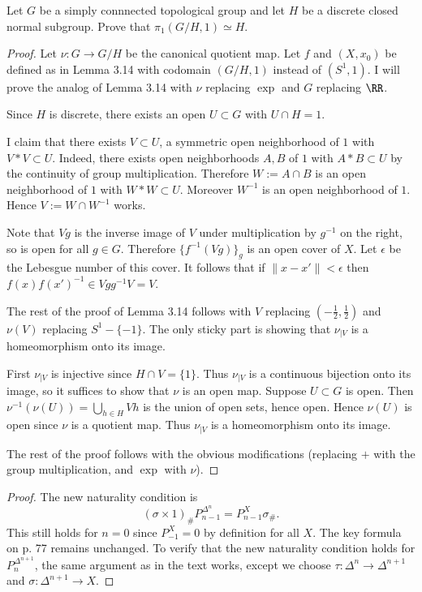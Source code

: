 \documentclass{article}
\begin{document}
 Let $G$ be a simply connnected topological group and let $H$ be a discrete closed
normal subgroup. Prove that $\pi_1(G/H, 1) \simeq H$.
\begin{proof}
Let $\nu: G \to G/H$ be the canonical quotient map. Let $f$ and $(X,x_0)$ be defined as in Lemma 3.14 with
codomain $(G/H,1)$ instead of $(S^1, 1)$. I will prove the analog of Lemma 3.14 with
$\nu$ replacing $\exp$ and $G$ replacing $\RR$.

Since $H$ is discrete, there exists an open $U \subset G$ with $U \cap H = 1$. 

I claim that there exists $V \subset U$, a symmetric open neighborhood of $1$ with $V*V \subset U$.
Indeed, there exists open neighborhoods $A,B$ of $1$ with $A*B \subset U$ by the continuity of 
group multiplication.  Therefore $W := A \cap B$ is an open neighborhood of $1$ with $W*W \subset U$.
Moreover $W^{-1}$ is an open neighborhood of $1$.  Hence $V:= W \cap W^{-1}$ works.

Note that $Vg$ is the inverse image of $V$ under multiplication by $g^{-1}$ on the right, so is open for all $g \in G$. 
Therefore $\{f^{-1}(Vg)\}_g$ is an open cover of $X$. Let $\epsilon$ be the Lebesgue number of this cover. It follows that if $\|x - x'\| < \epsilon$
then $f(x) f(x')^{-1} \in Vg g^{-1}V = V$.

The rest of the proof of Lemma 3.14 follows with $V$ replacing $(-\frac 1 2, \frac 1 2)$ and $\nu(V)$ replacing $S^1 - \{-1\}$. The only
sticky part is showing that $\nu_{|V}$ is a homeomorphism onto its image.

First $\nu_{|V}$ is injective since $H \cap V = \{1\}$. Thus $\nu_{|V}$ is a continuous bijection onto its image, so it suffices to show that
$\nu$ is an open map. Suppose $U \subset G$ is open. Then $\nu^{-1}(\nu(U)) = \bigcup_{h \in H} Vh$ is the union of open sets, hence open.
Hence $\nu(U)$ is open since $\nu$ is a quotient map.  Thus $\nu_{|V}$ is a homeomorphism onto its image.

The rest of the proof follows with the obvious modifications (replacing $+$ with the group multiplication, and $\exp$ with $\nu$).
\end{proof}

\begin{proof}
The new naturality condition is
$$(\sigma \times 1)_\# P^{\Delta^n}_{n-1} = P_{n-1}^X \sigma_\#.$$
This still holds for $n = 0$ since $P^X_{-1} = 0$ by definition for all $X$.
The key formula on p. 77 remains unchanged.
To verify that the new naturality condition holds for $P^{\Delta^{n+1}}_n$, the same argument as in the text works,
 except we choose $\tau : \Delta^{n} \to \Delta^{n+1}$ and $\sigma:\Delta^{n+1} \to X$.
\end{proof}
\end{document}
